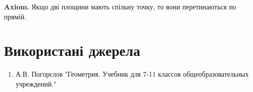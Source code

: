 \documentclass[a4paper, 10pt]{article}
\theoremstyle{theoremdd}
\theoremstyle{theoremdd}
\theoremstyle{theoremdd}
\newtheorem{definition}[theorem]{Definition}
\theoremstyle{theoremdd}
\theoremstyle{theoremdd}
\theoremstyle{theoremdd}
\theoremstyle{theoremdd}
\theoremstyle{theoremdd}
\theoremstyle{theoremdd}
\begin{document}
\textbf{Axiom.} Якщо дві площини мають спільну точку, то вони перетинаються по прямій.

\newpage

\section*{Використані джерела}
\begin{enumerate}
\item А.В. Погорєлов "Геометрия. Учебник для 7-11 классов общеобразовательных учреждений."
\end{enumerate}
\end{document}
